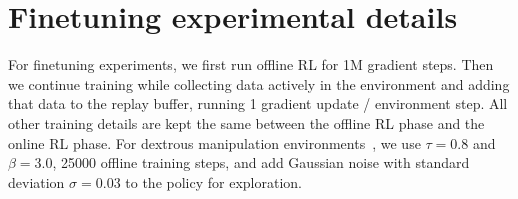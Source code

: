 \begin{table}[!htp]\centering
\caption{Evaluation on Franca Kitchen and Adroit tasks from D4RL}\label{tab:franca_adroit}
\end{table}

\section{Finetuning experimental details}
\label{app:finetuning}
For finetuning experiments, we first run offline RL for 1M gradient steps. Then we continue training while collecting data actively in the environment and adding that data to the replay buffer, running 1 gradient update / environment step. All other training details are kept the same between the offline RL phase and the online RL phase. For dextrous manipulation environments~\citep{rajeswaran2018dextrous}, we use $\tau=0.8$ and $\beta=3.0$, 25000 offline training steps, and add Gaussian noise with standard deviation $\sigma=0.03$ to the policy for exploration.

